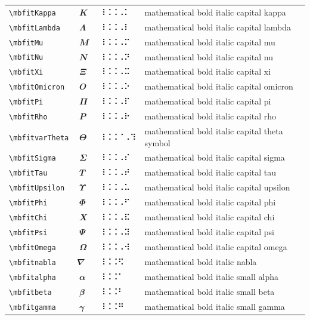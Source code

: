 \documentclass[oneside]{article}
\begin{document}
\begin{longtable}{llll}
\verb|\mbfitKappa| & $\mbfitKappa$ &  ⠸⠨⠨⠠⠅  & {mathematical bold italic capital kappa} \\[2ex]
\verb|\mbfitLambda| & $\mbfitLambda$ &  ⠸⠨⠨⠠⠇  & {mathematical bold italic capital lambda} \\[2ex]
\verb|\mbfitMu| & $\mbfitMu$ &  ⠸⠨⠨⠠⠍  & {mathematical bold italic capital mu} \\[2ex]
\verb|\mbfitNu| & $\mbfitNu$ &  ⠸⠨⠨⠠⠝  & {mathematical bold italic capital nu} \\[2ex]
\verb|\mbfitXi| & $\mbfitXi$ &  ⠸⠨⠨⠠⠭  & {mathematical bold italic capital xi} \\[2ex]
\verb|\mbfitOmicron| & $\mbfitOmicron$ &  ⠸⠨⠨⠠⠕  & {mathematical bold italic capital omicron} \\[2ex]
\verb|\mbfitPi| & $\mbfitPi$ &  ⠸⠨⠨⠠⠏  & {mathematical bold italic capital pi} \\[2ex]
\verb|\mbfitRho| & $\mbfitRho$ &  ⠸⠨⠨⠠⠗  & {mathematical bold italic capital rho} \\[2ex]
\verb|\mbfitvarTheta| & $\mbfitvarTheta$ &  ⠸⠨⠨⠈⠠⠹  & {mathematical bold italic capital theta symbol} \\[2ex]
\verb|\mbfitSigma| & $\mbfitSigma$ &  ⠸⠨⠨⠠⠎  & {mathematical bold italic capital sigma} \\[2ex]
\verb|\mbfitTau| & $\mbfitTau$ &  ⠸⠨⠨⠠⠞  & {mathematical bold italic capital tau} \\[2ex]
\verb|\mbfitUpsilon| & $\mbfitUpsilon$ &  ⠸⠨⠨⠠⠥  & {mathematical bold italic capital upsilon} \\[2ex]
\verb|\mbfitPhi| & $\mbfitPhi$ &  ⠸⠨⠨⠠⠋  & {mathematical bold italic capital phi} \\[2ex]
\verb|\mbfitChi| & $\mbfitChi$ &  ⠸⠨⠨⠠⠯  & {mathematical bold italic capital chi} \\[2ex]
\verb|\mbfitPsi| & $\mbfitPsi$ &  ⠸⠨⠨⠠⠽  & {mathematical bold italic capital psi} \\[2ex]
\verb|\mbfitOmega| & $\mbfitOmega$ &  ⠸⠨⠨⠠⠺  & {mathematical bold italic capital omega} \\[2ex]
\verb|\mbfitnabla| & $\mbfitnabla$ &  ⠸⠨⠨⠫  & {mathematical bold italic nabla} \\[2ex]
\verb|\mbfitalpha| & $\mbfitalpha$ &  ⠸⠨⠨⠁  & {mathematical bold italic small alpha} \\[2ex]
\verb|\mbfitbeta| & $\mbfitbeta$ &  ⠸⠨⠨⠃  & {mathematical bold italic small beta} \\[2ex]
\verb|\mbfitgamma| & $\mbfitgamma$ &  ⠸⠨⠨⠛  & {mathematical bold italic small gamma} \\[2ex]

\end{longtable}
\end{document}
